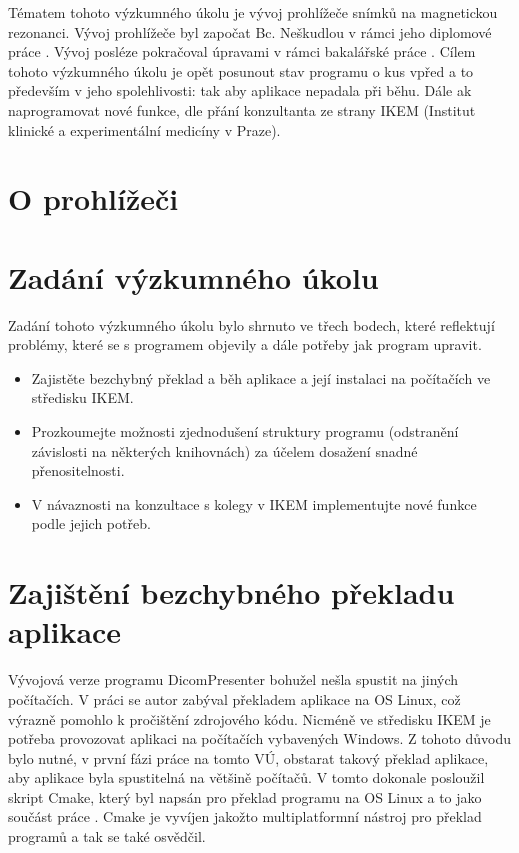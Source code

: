 \vspace{-10mm}
Tématem tohoto výzkumného úkolu je vývoj prohlížeče snímků na magnetickou rezonanci. Vývoj prohlížeče byl započat Bc. Neškudlou v rámci jeho diplomové práce \cite{neskudla}. Vývoj posléze pokračoval úpravami v rámci bakalářské práce \cite{flaska}. Cílem tohoto výzkumného úkolu je opět posunout stav programu o kus vpřed a to především v jeho spolehlivosti: tak aby aplikace nepadala při běhu. Dále ak naprogramovat nové funkce, dle přání konzultanta ze strany IKEM (Institut klinické a experimentální medicíny v Praze).

\section{O prohlížeči}


\section{Zadání výzkumného úkolu}
Zadání tohoto výzkumného úkolu bylo shrnuto ve třech bodech, které reflektují problémy, které se s programem objevily a dále potřeby jak program upravit.

\begin{itemize}
\item Zajistěte bezchybný překlad a běh aplikace a její instalaci na počítačích ve středisku IKEM.
\item Prozkoumejte možnosti zjednodušení struktury programu (odstranění závislosti na některých knihovnách) za účelem dosažení snadné přenositelnosti.
\item V návaznosti na konzultace s kolegy v IKEM implementujte nové funkce podle jejich potřeb.
\end{itemize}

\section{Zajištění bezchybného překladu aplikace}
Vývojová verze programu DicomPresenter bohužel nešla spustit na jiných počítačích. V práci \cite{flaska} se autor zabýval překladem aplikace na OS Linux, což výrazně pomohlo k pročištění zdrojového kódu. Nicméně ve středisku IKEM je potřeba provozovat aplikaci na počítačích vybavených Windows. Z tohoto důvodu bylo nutné, v první fázi práce na tomto VÚ, obstarat takový překlad aplikace, aby aplikace byla spustitelná na většině počítačů. V tomto dokonale posloužil skript Cmake, který byl napsán pro překlad programu na OS Linux a to jako součást práce \cite{flaska}. Cmake je vyvíjen jakožto multiplatformní nástroj pro překlad programů a tak se také osvědčil. 

